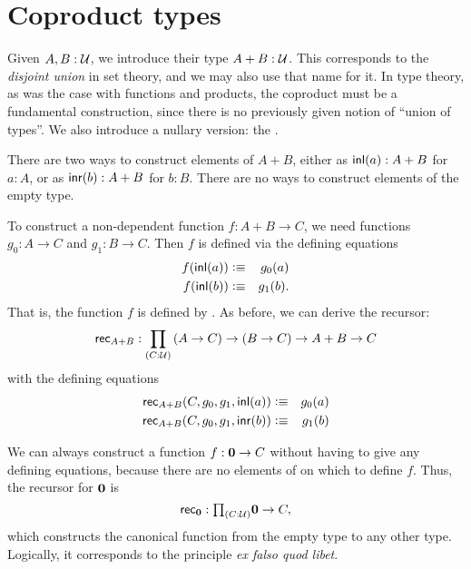 \section{Coproduct types}
\label{sec:coproduct-types}

Given $A,B:\mathcal{U}$, we introduce their  type $A+B:\mathcal{U}$.
%
%
%
%
%
%
This corresponds to the \emph{disjoint union} in set theory, and we may also use that name for it.
In type theory, as was the case with functions and products, the coproduct must be a fundamental construction, since there is no previously given notion of ``union of types''.
We also introduce a
nullary version: the .
%
%
%

There are two ways to construct elements of $A+B$, either as ${\mathsf{inl}}(a) : A+B$ for $a:A$, or as
${\mathsf{inr}}(b):A+B$ for $b:B$. There are no ways to construct elements of the empty type. 

To construct a non-dependent function $f : A+B \to C$, we need 
functions $g_0 : A \to C$ and $g_1 : B \to C$. Then $f$ is defined
via the defining equations
\begin{eqnarray*}
  f({\mathsf{inl}}(a)) & \vcentcolon\equiv & g_0(a) \\
  f({\mathsf{inl}}(b)) & \vcentcolon\equiv & g_1(b).
\end{eqnarray*}
That is, the function $f$ is defined by .
%
As before, we can derive the recursor:
%
\[ \rec{A+B} : \dprd{C:\UU}(A \to C) \to (B\to C) \to A+B \to C\]
with the defining equations
\begin{eqnarray*}
\mathsf{rec}_{A+B}(C,g_0,g_1,{\mathsf{inl}}(a)) & \vcentcolon\equiv & g_0(a) \\
\mathsf{rec}_{A+B}(C,g_0,g_1,{\mathsf{inr}}(b)) & \vcentcolon\equiv & g_1(b)
\end{eqnarray*}

We can always construct a function $f : \mathbf{0} \to C$ without
having to give any defining equations, because there are no elements of \emptyt on which to define $f$.
Thus, the recursor for $\mathbf{0}$ is
%
\[\rec{\emptyt} : \tprd{C:\UU} \emptyt \to C,\]
which constructs the canonical function from the empty type to any other type.
Logically, it corresponds to the principle \emph{ex falso quod libet}.

